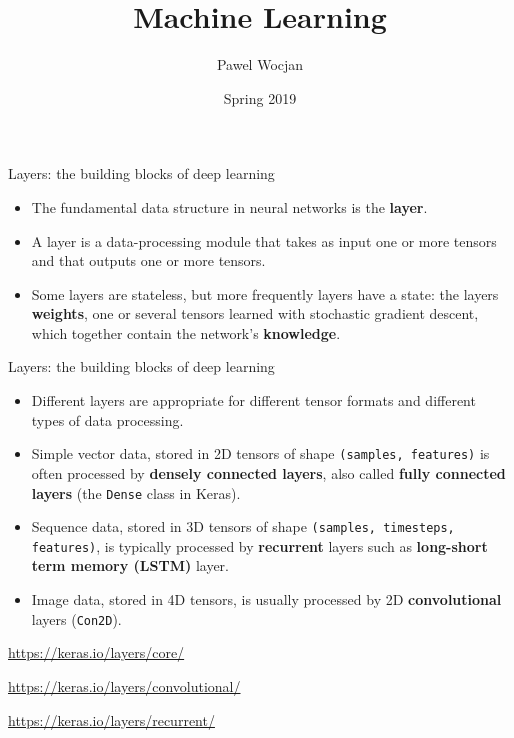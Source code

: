 \documentclass{beamer}
\title[ML]{Machine Learning}
\author{Pawel Wocjan}
\institute{University of Central Florida}
\date{Spring 2019}
\begin{document}
\begin{frame}
  \titlepage
\end{frame}


\begin{frame}{Layers: the building blocks of deep learning}
\begin{itemize}
\item The fundamental data structure in neural networks is the {\bf layer}.
\item A layer is a data-processing module that takes as input one or more tensors and that outputs one or more tensors.
\item Some layers are stateless, but more frequently layers have a state: the layers {\bf weights}, one or several tensors learned with stochastic gradient descent, which together contain the network's {\bf knowledge}.
\end{itemize}
\end{frame}

\begin{frame}{Layers: the building blocks of deep learning}
\begin{itemize}
\item Different layers are appropriate for different tensor formats and different types of data processing.
\item Simple vector data, stored in 2D tensors of shape \texttt{(samples, features)} is often processed by {\bf densely connected layers}, also called {\bf fully connected layers} (the \texttt{Dense} class in Keras).
\item Sequence data, stored in 3D tensors of shape \texttt{(samples, timesteps, features)}, is typically processed by {\bf recurrent} layers such as {\bf long-short term memory (LSTM)} layer.
\item Image data, stored in 4D tensors, is usually processed by 2D \textbf{convolutional} layers (\texttt{Con2D}). 
\end{itemize}

\url{https://keras.io/layers/core/}

\url{https://keras.io/layers/convolutional/}

\url{https://keras.io/layers/recurrent/}
\end{frame}
\end{document}
